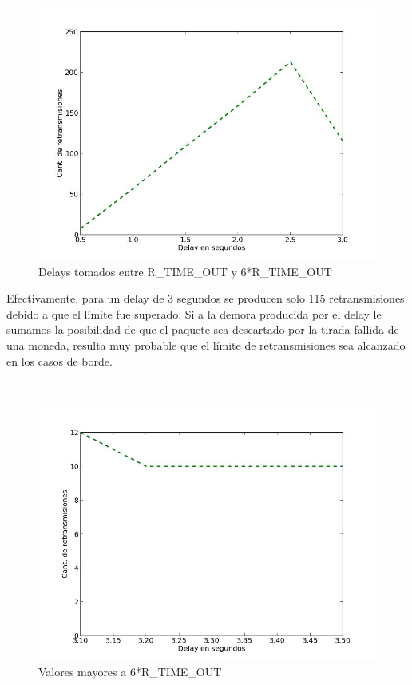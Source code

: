 \begin{figure}[H]
	\begin{center}
		  \includegraphics[scale=0.40]{../graficos/retransmissions_2.png}
		  \caption{Delays tomados entre R\_TIME\_OUT y 6*R\_TIME\_OUT}
		  \label{fig:contra1}
	\end{center}
\end{figure}

Efectivamente, para un delay de 3 segundos se producen solo 115 retransmisiones debido a que el límite fue superado.
Si a la demora producida por el delay le sumamos la posibilidad de que el paquete sea descartado por la tirada fallida
de una moneda, resulta muy probable que el límite de retransmisiones sea alcanzado en los casos de borde.

~

\begin{figure}[H]
	\begin{center}
		  \includegraphics[scale=0.40]{../graficos/retransmissions_3.png}
		  \caption{Valores mayores a 6*R\_TIME\_OUT}
		  \label{fig:contra1}
	\end{center}
\end{figure}

